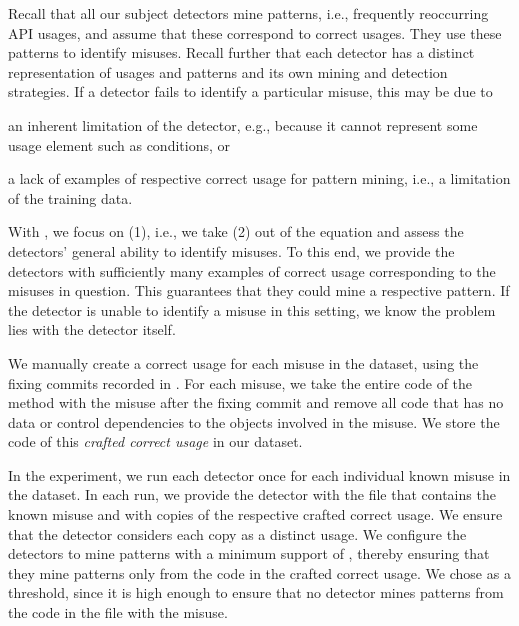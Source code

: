 Recall that all our subject detectors mine patterns, i.e., frequently reoccurring API usages, and assume that these correspond to correct usages.
They use these patterns to identify misuses.
Recall further that each detector has a distinct representation of usages and patterns and its own mining and detection strategies.
If a detector fails to identify a particular misuse, this may be due to
\begin{enumerate*}[label=(\arabic*)]
  \item an inherent limitation of the detector, e.g., because it cannot represent some usage element such as conditions, or
  \item a lack of examples of respective correct usage for pattern mining, i.e., a limitation of the training data.
\end{enumerate*}
With , we focus on (1), i.e., we take (2) out of the equation and assess the detectors' general ability to identify misuses.
To this end, we provide the detectors with sufficiently many examples of correct usage corresponding to the misuses in question.
This guarantees that they could mine a respective pattern.
If the detector is unable to identify a misuse in this setting, we know the problem lies with the detector itself.

We manually create a correct usage for each misuse in the dataset, using the fixing commits recorded in \MUBench.
For each misuse, we take the entire code of the method with the misuse after the fixing commit and remove all code that has no data or control dependencies to the objects involved in the misuse.
We store the code of this \emph{crafted correct usage} in our dataset.

In the experiment, we run each detector once for each individual known misuse in the dataset.
In each run, we provide the detector with the file that contains the known misuse and with  copies of the respective crafted correct usage.
We ensure that the detector considers each copy as a distinct usage.
We configure the detectors to mine patterns with a minimum support of , thereby ensuring that they mine patterns only from the code in the crafted correct usage.
We chose  as a threshold, since it is high enough to ensure that no detector mines patterns from the code in the file with the misuse.

